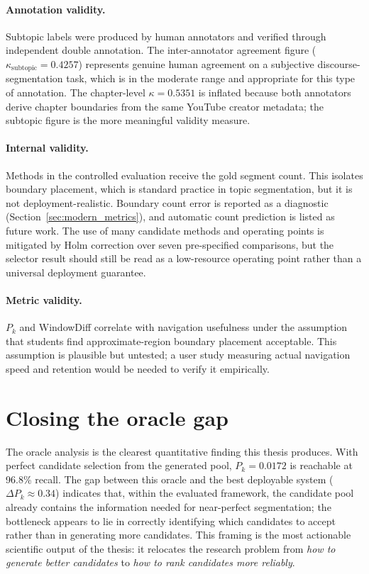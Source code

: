 \paragraph{Annotation validity.}
Subtopic labels were produced by human annotators and verified through
independent double annotation. The inter-annotator agreement figure
($\kappa_{\text{subtopic}}=0.4257$) represents genuine human agreement
on a subjective discourse-segmentation task, which is in the moderate range
and appropriate for this type of annotation.
The chapter-level $\kappa=0.5351$ is inflated because both annotators derive
chapter boundaries from the same YouTube creator metadata; the subtopic figure
is the more meaningful validity measure.

\paragraph{Internal validity.}
Methods in the controlled evaluation receive the gold segment count.
This isolates boundary placement, which is standard practice in topic
segmentation, but it is not deployment-realistic.
Boundary count error is reported as a diagnostic
(Section~\ref{sec:modern_metrics}), and automatic count prediction is listed
as future work.
The use of many candidate methods and operating points is mitigated by
Holm correction over seven pre-specified comparisons, but the selector
result should still be read as a low-resource operating point rather than
a universal deployment guarantee.

\paragraph{Metric validity.}
$P_k$ and WindowDiff correlate with navigation usefulness under the assumption
that students find approximate-region boundary placement acceptable.
This assumption is plausible but untested; a user study measuring actual
navigation speed and retention would be needed to verify it empirically.

\section{Closing the oracle gap}
\label{sec:oracle_gap_discussion}

The oracle analysis is the clearest quantitative finding this thesis produces.
With perfect candidate selection from the generated pool, $P_k=0.0172$ is
reachable at 96.8\% recall.
The gap between this oracle and the best deployable system
($\Delta P_k \approx 0.34$) indicates that, within the evaluated framework,
the candidate pool already contains the information needed for near-perfect
segmentation; the bottleneck appears to lie in correctly identifying which
candidates to accept rather than in generating more candidates.
This framing is the most actionable scientific output of the thesis: it
relocates the research problem from \emph{how to generate better candidates}
to \emph{how to rank candidates more reliably}.


